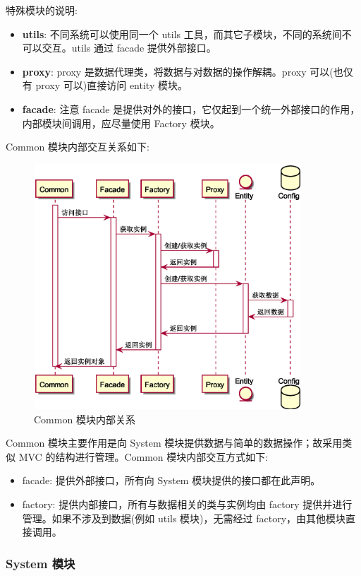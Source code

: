 特殊模块的说明:
\begin{itemize}
    \item \textbf{utils}: 不同系统可以使用同一个 utils 工具，而其它子模块，不同的系统间不可以交互。utils 通过 facade 提供外部接口。
    \item \textbf{proxy}: proxy 是数据代理类，将数据与对数据的操作解耦。proxy 可以(也仅有 proxy 可以)直接访问 entity 模块。
    \item \textbf{facade}: 注意 facade 是提供对外的接口，它仅起到一个统一外部接口的作用，内部模块间调用，应尽量使用 Factory 模块。
\end{itemize}

Common 模块内部交互关系如下:

\begin{figure}[H]
    \scriptsize
    \centering
    \includegraphics[width=10cm]{images/puml/common.eps} 
    \caption{Common 模块内部关系}
    \label{fig:Common 模块内部关系}
\end{figure}

Common 模块主要作用是向 System 模块提供数据与简单的数据操作；故采用类似 MVC 的结构进行管理。Common 模块内部交互方式如下:
\begin{itemize}
    \item facade: 提供外部接口，所有向 System 模块提供的接口都在此声明。
    \item factory: 提供内部接口，所有与数据相关的类与实例均由 factory 提供并进行管理。如果不涉及到数据(例如 utils 模块)，无需经过 factory，由其他模块直接调用。
\end{itemize}

\subsubsection{System 模块}

